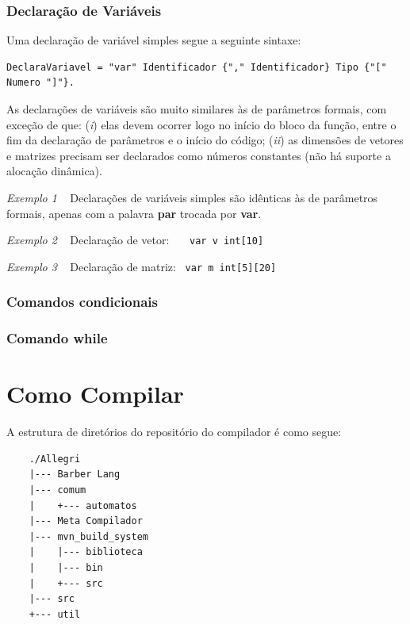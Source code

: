 \documentclass[a4paper,12pt]{report}
\begin{document}
    \subsubsection*{Declaração de Variáveis}
    Uma declaração de variável simples segue a seguinte sintaxe:
    \begin{verbatim}
DeclaraVariavel = "var" Identificador {"," Identificador} Tipo {"[" Numero "]"}. \end{verbatim}
    As declarações de variáveis são muito similares às de parâmetros formais, com exceção de que: (\textit{i}) elas devem ocorrer logo no início do bloco da função, entre o fim da declaração de parâmetros e o início do código; (\textit{ii}) as dimensões de vetores e matrizes precisam ser declarados como números constantes (não há suporte a alocação dinâmica).
    
    \textit{Exemplo 1} ~
     Declarações de variáveis simples são idênticas às de parâmetros formais, apenas com a palavra \textbf{par} trocada por \textbf{var}.

    \textit{Exemplo 2} ~
     Declaração de vetor: ~~~\verb|var v int[10]|
    
    \textit{Exemplo 3} ~
     Declaração de matriz: ~\verb|var m int[5][20]|


    \subsubsection*{Comandos condicionais}


    \subsubsection*{Comando while}

    \section*{Como Compilar}
    A estrutura de diretórios do repositório do compilador é como segue:
    \begin{verbatim}
    ./Allegri
    |--- Barber Lang
    |--- comum
    |    +--- automatos
    |--- Meta Compilador
    |--- mvn_build_system
    |    |--- biblioteca
    |    |--- bin
    |    +--- src
    |--- src
    +--- util
    \end{verbatim}
\end{document}
